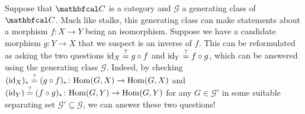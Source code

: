 \begin{remark}
	Suppose that $\category C$ is a category and $\mathcal G$ a generating class of $\category C$. Much like stalks, this generating class can make statements about a morphism $f\colon X\to Y$ being an isomorphism. Suppose we have a candidate morphism $g\colon Y\to X$ that we suspect is an inverse of $f$. This can be reformulated as asking the two questions $\mathrm{id}_X \overset{?}= g\circ f$ and $\mathrm{id}_Y\overset ? = f\circ g$, which can be answered using the generating class $\mathcal G$. Indeed, by checking $(\mathrm{id}_X)_\ast\overset ? = (g\circ f)_\ast \colon {\operatorname{Hom}}(G, X)\to {\operatorname{Hom}}(G, X)$ and $(\mathrm{id}_Y)\overset ? = (f\circ g)_\ast\colon {\operatorname{Hom}}(G, Y)\to{\operatorname{Hom}}(G, Y)$ for any $G\in\mathcal G'$ in some suitable separating set $\mathcal G'\subseteq \mathcal G$, we can answer these two questions!
\end{remark}

